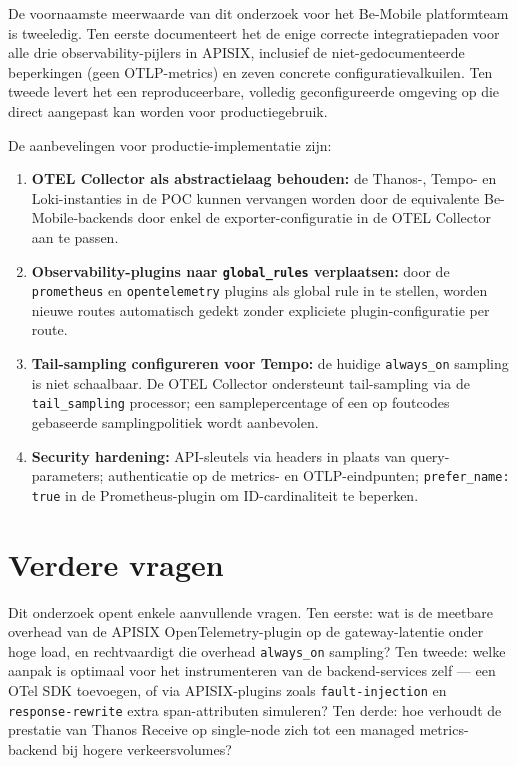 De voornaamste meerwaarde van dit onderzoek voor het Be-Mobile platformteam is tweeledig. Ten eerste documenteert het de enige correcte integratiepaden voor alle drie observability-pijlers in APISIX, inclusief de niet-gedocumenteerde beperkingen (geen OTLP-metrics) en zeven concrete configuratievalkuilen. Ten tweede levert het een reproduceerbare, volledig geconfigureerde omgeving op die direct aangepast kan worden voor productiegebruik.

De aanbevelingen voor productie-implementatie zijn:

\begin{enumerate}
  \item \textbf{OTEL Collector als abstractielaag behouden:} de Thanos-, Tempo- en Loki-instanties in de POC kunnen vervangen worden door de equivalente Be-Mobile-backends door enkel de exporter-configuratie in de OTEL Collector aan te passen.
  \item \textbf{Observability-plugins naar \texttt{global\_rules} verplaatsen:} door de \texttt{prometheus} en \texttt{opentelemetry} plugins als global rule in te stellen, worden nieuwe routes automatisch gedekt zonder expliciete plugin-configuratie per route.
  \item \textbf{Tail-sampling configureren voor Tempo:} de huidige \texttt{always\_on} sampling is niet schaalbaar. De OTEL Collector ondersteunt tail-sampling via de \texttt{tail\_sampling} processor; een samplepercentage of een op foutcodes gebaseerde samplingpolitiek wordt aanbevolen.
  \item \textbf{Security hardening:} API-sleutels via headers in plaats van query-parameters; authenticatie op de metrics- en OTLP-eindpunten; \texttt{prefer\_name: true} in de Prometheus-plugin om ID-cardinaliteit te beperken.
\end{enumerate}

\section{Verdere vragen}

Dit onderzoek opent enkele aanvullende vragen. Ten eerste: wat is de meetbare overhead van de APISIX OpenTelemetry-plugin op de gateway-latentie onder hoge load, en rechtvaardigt die overhead \texttt{always\_on} sampling? Ten tweede: welke aanpak is optimaal voor het instrumenteren van de backend-services zelf --- een OTel SDK toevoegen, of via APISIX-plugins zoals \texttt{fault-injection} en \texttt{response-rewrite} extra span-attributen simuleren? Ten derde: hoe verhoudt de prestatie van Thanos Receive op single-node zich tot een managed metrics-backend bij hogere verkeersvolumes?

